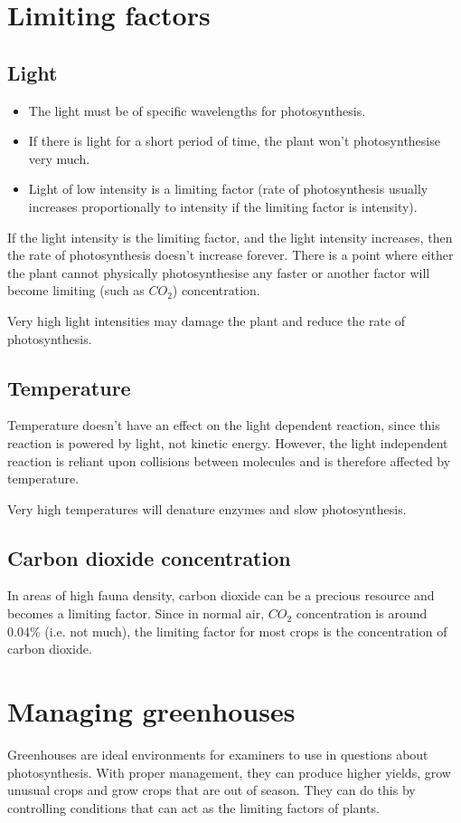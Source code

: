\documentclass{article}
\begin{document}
\section*{Limiting factors}
\subsection*{Light}
\begin{itemize}
	\item The light must be of specific wavelengths for photosynthesis.
	\item If there is light for a short period of time, the plant won't
	photosynthesise very much.
	\item Light of low intensity is a limiting factor (rate of photosynthesis
	usually increases proportionally to intensity if the limiting factor is
	intensity).
\end{itemize}
If the light intensity is the limiting factor, and the light intensity
increases, then the rate of photosynthesis doesn't increase forever. There is a
point where either the plant cannot physically photosynthesise any faster or
another factor will become limiting (such as $CO_2$) concentration.

Very high light intensities may damage the plant and reduce the rate of
photosynthesis.

\subsection*{Temperature}
Temperature doesn't have an effect on the light dependent reaction, since this
reaction is powered by light, not kinetic energy. However, the light independent
reaction is reliant upon collisions between molecules and is therefore affected
by temperature.

Very high temperatures will denature enzymes and slow photosynthesis.

\subsection*{Carbon dioxide concentration}
In areas of high fauna density, carbon dioxide can be a precious resource and
becomes a limiting factor. Since in normal air, $CO_2$ concentration is around
0.04\% (i.e. not much), the limiting factor for most crops is the concentration
of carbon dioxide.


\section*{Managing greenhouses}
Greenhouses are ideal environments for examiners to use in questions about
photosynthesis. With proper management, they can produce higher yields, grow
unusual crops and grow crops that are out of season. They can do this by
controlling conditions that can act as the limiting factors of plants.
\end{document}

